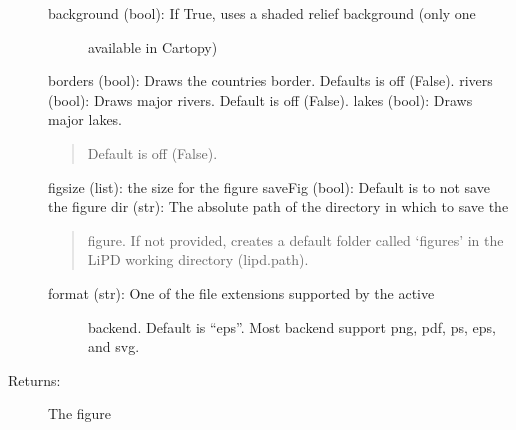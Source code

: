 \documentclass[letterpaper,10pt,english]{sphinxmanual}
\begin{document}
\begin{fulllineitems}
\begin{description}
\begin{description}
\item[{background (bool): If True, uses a shaded relief background (only one }] \leavevmode
available in Cartopy)

\end{description}

borders (bool): Draws the countries border. Defaults is off (False). 
rivers (bool): Draws major rivers. Default is off (False).
lakes (bool): Draws major lakes.
\begin{quote}

Default is off (False).
\end{quote}

figsize (list): the size for the figure
saveFig (bool): Default is to not save the figure
dir (str): The absolute path of the directory in which to save the
\begin{quote}

figure. If not provided, creates a default folder called ‘figures’
in the LiPD working directory (lipd.path).
\end{quote}
\begin{description}
\item[{format (str): One of the file extensions supported by the active}] \leavevmode
backend. Default is “eps”. Most backend support png, pdf, ps, eps,
and svg.

\end{description}

\item[{Returns:}] \leavevmode
The figure

\end{description}

\end{fulllineitems}

\end{document}
